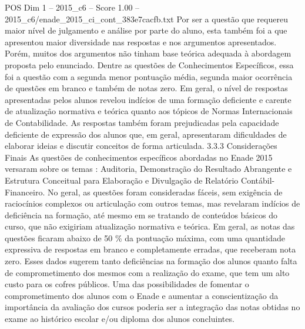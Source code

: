 \begin{textsample}{POS Dim 1 – 2015\_c6 – Score 1.00 – 2015\_c6/enade\_2015\_ci\_cont\_383e7cacfb.txt}
Por ser a questão que requereu maior nível de julgamento e análise por parte do aluno, esta também foi a que apresentou maior diversidade nas respostas e nos argumentos apresentados.
Porém, muitos dos argumentos não tinham base teórica adequada à abordagem proposta pelo enunciado.
Dentre as questões de Conhecimentos Específicos, essa foi a questão com a segunda menor pontuação média, segunda maior ocorrência de questões em branco e também de notas zero.
Em geral, o nível de respostas apresentadas pelos alunos revelou indícios de uma formação deficiente e carente de atualização normativa e teórica quanto aos tópicos de Normas Internacionais de Contabilidade.
As respostas também foram prejudicadas pela capacidade deficiente de expressão dos alunos que, em geral, apresentaram dificuldades de elaborar ideias e discutir conceitos de forma articulada. 3.3.3 Considerações Finais As questões de conhecimentos específicos abordadas no Enade 2015 versaram sobre os temas : Auditoria, Demonstração do Resultado Abrangente e Estrutura Conceitual para Elaboração e Divulgação de Relatório Contábil-Financeiro.
No geral, as questões foram consideradas fáceis, sem exigência de raciocínios complexos ou articulação com outros temas, mas revelaram indícios de deficiência na formação, até mesmo em se tratando de conteúdos básicos do curso, que não exigiriam atualização normativa e teórica.
Em geral, as notas das questões ficaram abaixo de 50 \% da pontuação máxima, com uma quantidade expressiva de respostas em branco e completamente erradas, que receberam nota zero.
Esses dados sugerem tanto deficiências na formação dos alunos quanto falta de comprometimento dos mesmos com a realização do exame, que tem um alto custo para os cofres públicos.
Uma das possibilidades de fomentar o comprometimento dos alunos com o Enade e aumentar a conscientização da importância da avaliação dos cursos poderia ser a integração das notas obtidas no exame ao histórico escolar e/ou diploma dos alunos concluintes.

\end{textsample}
